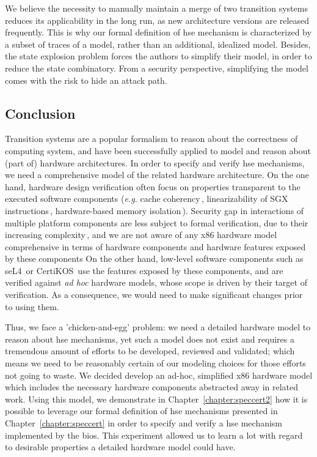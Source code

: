 We believe the necessity to manually maintain a merge of two transition systems
reduces its applicability in the long run, as new architecture versions are
released frequently.
%
This is why our formal definition of \ac{hse} mechanism is characterized by a
subset of traces of a model, rather than an additional, idealized model.
%
Besides, the state explosion problem forces the authors to simplify their model,
in order to reduce the state combinatory.
%
From a security perspective, simplifying the model comes with the risk to hide
an attack path.
%

\subsection{Conclusion}
%
\label{subsec:sota:ltsconclusion}

Transition systems are a popular formalism to reason about the correctness of
computing system, and have been successfully applied to model and reason about
(part of) hardware architectures.
%
In order to specify and verify \ac{hse} mechanisms, we need a comprehensive
model of the related hardware architecture.
%
On the one hand, hardware design verification often focus on properties
transparent to the executed software components (\emph{e.g.} cache
coherency\,\cite{stern1995cachecoherence}, linearizability of SGX
instructions\,\cite{leslie2015linsgx}, hardware-based memory
isolation\,\cite{lie2003xom}).
%
Security gap in interactions of multiple platform components are less subject to
formal verification, due to their increasing
complexity\,\cite{potlapally2011hardwaresecurity}, and we are not aware of any
x86 hardware model comprehensive in terms of hardware components and hardware
features exposed by these components
%
On the other hand, low-level software components such as
seL4\,\cite{klein2009sel4} or CertiKOS\,\cite{gu2016certikos} use the features
exposed by these components, and are verified against \emph{ad hoc} hardware
models, whose scope is driven by their target of verification.
%
As a consequence, we would need to make significant changes prior to using them.

Thus, we face a 'chicken-and-egg' problem: we need a detailed hardware model to
reason about \ac{hse} mechanisms, yet such a model does not exist and requires a
tremendous amount of efforts to be developed, reviewed and validated; which
means we need to be reasonably certain of our modeling choices for those efforts
not going to waste.
%
We decided develop an ad-hoc, simplified x86 hardware model which includes the
necessary hardware components abstracted away in related work.
%
Using this model, we demonstrate in Chapter~\ref{chapter:speccert2} how it is
possible to leverage our formal definition of \ac{hse} mechanisms presented in
Chapter~\ref{chapter:speccert} in order to specify and verify a \ac{hse}
mechanism implemented by the \ac{bios}.
%
This experiment allowed us to learn a lot with regard to desirable properties a
detailed hardware model could have.

